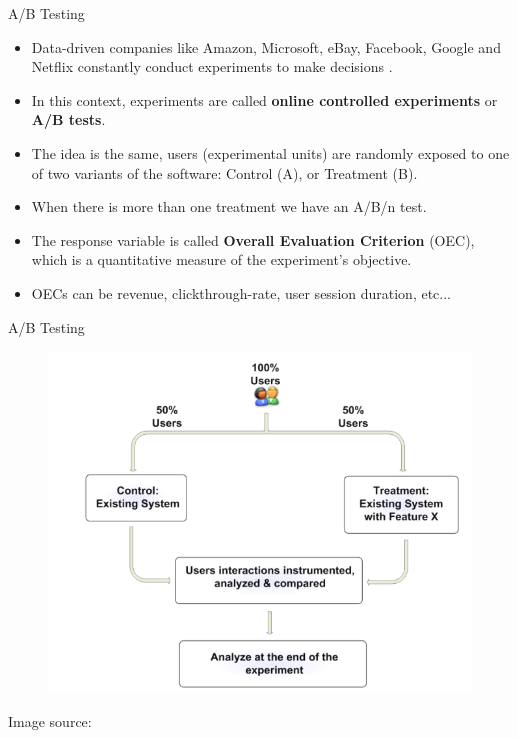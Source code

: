 \documentclass[handout]{beamer}
\begin{document}
\begin{frame}{A/B Testing}
\scriptsize{


\begin{itemize}

\item Data-driven companies like Amazon, Microsoft, eBay, Facebook, Google and Netflix constantly conduct experiments to make decisions \cite{kohavi2012trustworthy}.

\item In this context, experiments are called \textbf{online  controlled experiments} or \textbf{A/B tests}. 
 

 \item The idea is the same, users (experimental units) are randomly exposed to one of two variants of the software: Control (A), or Treatment (B).
 
 \item When there is more than one treatment we have an A/B/n test.
 
 \item The response variable is called \textbf{Overall  Evaluation  Criterion} (OEC), which is a quantitative measure of the experiment's objective. 
 
 \item OECs can be revenue, clickthrough-rate, user session duration, etc...
 \end{itemize}

} 
\end{frame}


\begin{frame}{A/B Testing}

 \begin{figure}[h!]
	\centering
	\includegraphics[scale=0.34]{pics/abtest.png}
\end{figure}
Image source: \cite{kohavi2012trustworthy} 
\end{frame}
\end{document}
